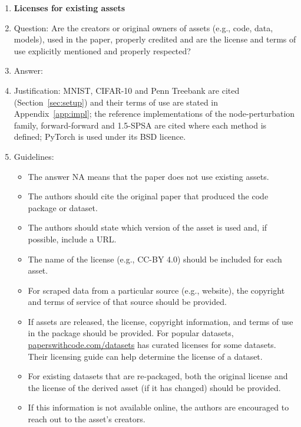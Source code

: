 \documentclass{article}
\begin{document}
\begin{enumerate}
\item {\bf Licenses for existing assets}
    \item[] Question: Are the creators or original owners of assets (e.g., code, data, models), used in the paper, properly credited and are the license and terms of use explicitly mentioned and properly respected?
    \item[] Answer: \answerYes{}
    \item[] Justification: MNIST, CIFAR-10 and Penn Treebank are cited (Section~\ref{sec:setup}) and their terms of use are stated in Appendix~\ref{app:impl}; the reference implementations of the node-perturbation family, forward-forward and 1.5-SPSA are cited where each method is defined; PyTorch is used under its BSD licence.
    \item[] Guidelines:
    \begin{itemize}
        \item The answer NA means that the paper does not use existing assets.
        \item The authors should cite the original paper that produced the code package or dataset.
        \item The authors should state which version of the asset is used and, if possible, include a URL.
        \item The name of the license (e.g., CC-BY 4.0) should be included for each asset.
        \item For scraped data from a particular source (e.g., website), the copyright and terms of service of that source should be provided.
        \item If assets are released, the license, copyright information, and terms of use in the package should be provided. For popular datasets, \url{paperswithcode.com/datasets} has curated licenses for some datasets. Their licensing guide can help determine the license of a dataset.
        \item For existing datasets that are re-packaged, both the original license and the license of the derived asset (if it has changed) should be provided.
        \item If this information is not available online, the authors are encouraged to reach out to the asset's creators.
    \end{itemize}


\end{enumerate}
\end{document}
